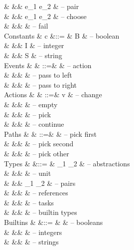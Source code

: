 \begin{grammar}
    &        &\mid& e_1 \And e_2                & – pair \\
    &        &\mid& e_1 \Or e_2                 & – choose \\
    &        &\mid& \Fail                       & – fail \\
  Constants
    & c      &::= & B \in \BB                   & – boolean \\
    &        &\mid& I \in \ZZ                   & – integer \\
    &        &\mid& S \in \SS                   & – string \\
  \addlinespace
  Events
    & \eta   & ::=& \alpha                      & – action \\
    &        &\mid& \Left \eta                  & – pass to left \\
    &        &\mid& \Right \eta                 & – pass to right \\
  Actions
    & \alpha & ::=& v                           & – change \\
    &        &\mid& \Empty                      & – empty \\
    &        &\mid& \Pick \pi                   & – pick \\
    &        &\mid& \Continue                   & – continue \\
  Paths
    & \pi    & ::=& \First                      & – pick first \\
    &        &\mid& \Second                     & – pick second \\
    &        &\mid& \Other \pi                  & – pick other \\
  \addlinespace
  Types
    & \tau   &::= & \tau_1 \to \tau_2           & – abstractions \\
    &        &\mid& \Unit                       & – unit \\
    &        &\mid& \tau_1 \times \tau_2        & – pairs \\
    &        &\mid& \Reference \tau             & – references \\
    &        &\mid& \Task \tau                  & – tasks \\
    &        &\mid& \beta                       & – builtin types \\
  Builtins
    & \beta  &::= & \Bool                       & – booleans \\
    &        &\mid& \Int                        & – integers \\
    &        &\mid& \String                     & – strings \\
\end{grammar}



